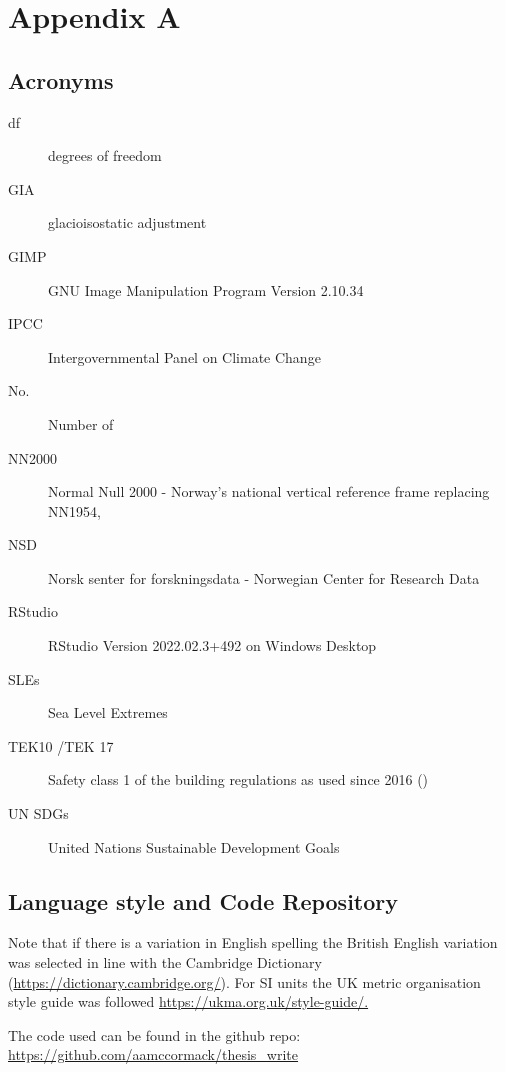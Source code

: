 
\chapter{Appendix A}
\section{Acronyms}
\begin{description}
\item[df]degrees of freedom
\item[GIA] glacioisostatic adjustment
\item[GIMP] GNU Image Manipulation Program Version 2.10.34
\item[IPCC] Intergovernmental Panel on Climate Change 
\item[No.] Number of
\item[NN2000] Normal Null 2000 - Norway's national vertical reference frame replacing NN1954, 
\item[NSD] Norsk senter for forskningsdata - Norwegian Center for Research Data
\item [RStudio] RStudio Version 2022.02.3+492 on Windows Desktop
\item[SLEs] Sea Level Extremes
\item[TEK10 /TEK 17] Safety class 1 of the building regulations as used since 2016 (\cite{tides_high_2022})
\item [UN SDGs] United Nations Sustainable Development Goals 
\end{description}

\section{Language style and Code Repository}
Note that if there is a variation in English spelling the British English variation was selected in line with the Cambridge Dictionary (\url{https://dictionary.cambridge.org/}). For SI units the UK metric organisation style guide was followed \url{https://ukma.org.uk/style-guide/.}  

The code used can be found in the github repo: 
\url{ https://github.com/aamccormack/thesis_write}